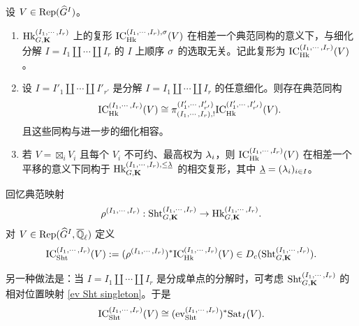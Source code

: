 \begin{lem}\label{l:IC Hk refine} 设 $V\in \textup{Rep}(\widehat{G}^{I})$。
\begin{enumerate}
\item $\textup{Hk}^{(I_{1},\cdots, I_{r})}_{G,\mathbf{K}}$ 上的复形 $\textup{IC}^{(I_{1},\cdots, I_{r}),\sigma}_{\textup{Hk}}(V)$ 在相差一个典范同构的意义下，与细化分解 $I=I_{1}\coprod\cdots \coprod I_{r}$ 的 $I$ 上顺序 $\sigma$ 的选取无关。记此复形为 $\textup{IC}^{(I_{1},\cdots, I_{r})}_{\textup{Hk}}(V)$。

\item 设 $I=I'_{1}\coprod\cdots \coprod I'_{r'}$ 是分解 $I=I_{1}\coprod\cdots \coprod I_{r}$ 的任意细化。则存在典范同构
\begin{equation*}
\textup{IC}^{(I_{1},\cdots, I_{r})}_{\textup{Hk}}(V)\cong \pi^{(I'_{1},\cdots, I'_{r'})}_{(I_{1},\cdots, I_{r}), !}\textup{IC}^{(I'_{1},\cdots, I'_{r'})}_{\textup{Hk}}(V).
\end{equation*}
且这些同构与进一步的细化相容。

\item 若 $V=\boxtimes_{i}V_{i}$ 且每个 $V_{i}$ 不可约、最高权为 $\lambda_{i}$，则 $\textup{IC}^{(I_{1},\cdots, I_{r})}_{\textup{Hk}}(V)$ 在相差一个平移的意义下同构于 $\textup{Hk}^{(I_{1},\cdots, I_{r}),\le\underline{\lambda}}_{G,\mathbf{K}}$ 的相交复形，其中 $\underline{\lambda}=(\lambda_{i})_{i\in I}$。
\end{enumerate}
\end{lem}


回忆典范映射
\begin{equation*}
\rho^{(I_{1},\cdots, I_{r})}: \textup{Sht}^{(I_{1},\cdots, I_{r})}_{G,\mathbf{K}}\to \textup{Hk}^{(I_{1},\cdots, I_{r})}_{G,\mathbf{K}}.
\end{equation*}
对 $V\in \textup{Rep}(\widehat{G}^{I}, \overline{\mathbb{Q}}_\ell)$ 定义
\begin{equation*}
\textup{IC}^{(I_{1},\cdots, I_{r})}_{\textup{Sht}}(V):=(\rho^{(I_{1},\cdots, I_{r})})^{*}\textup{IC}^{(I_{1},\cdots, I_{r})}_{\textup{Hk}}(V)\in D_{c}(\textup{Sht}^{(I_{1},\cdots, I_{r})}_{G,\mathbf{K}}).
\end{equation*}

另一种做法是：当 $I=I_{1}\coprod\cdots \coprod I_{r}$ 是分成单点的分解时，可考虑 $\textup{Sht}^{(I_{1},\cdots, I_{r})}_{G,\mathbf{K}}$ 的相对位置映射 \eqref{ev Sht singleton}。于是
\begin{equation*}
\textup{IC}^{(I_{1},\cdots, I_{r})}_{\textup{Sht}}(V)\cong (\textup{ev}_{\textup{Sht}}^{(I_{1},\cdots, I_{r})})^{*}\mathrm{Sat}_{I}(V).
\end{equation*}


